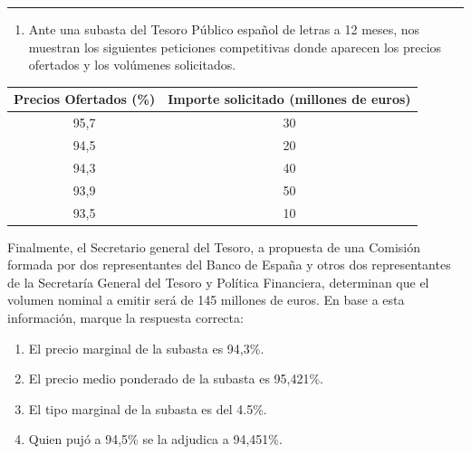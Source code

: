 \documentclass[
  letterpaper,
  DIV=11,
  numbers=noendperiod]{scrreprt}
\providecommand{\tightlist}{%
  \setlength{\itemsep}{0pt}\setlength{\parskip}{0pt}}\usepackage{longtable,booktabs,array}
\begin{document}
\begin{center}\rule{0.5\linewidth}{0.5pt}\end{center}

\begin{enumerate}
\def\labelenumi{\arabic{enumi}.}
\setcounter{enumi}{5}
\tightlist
\item
  Ante una subasta del Tesoro Público español de letras a 12 meses, nos
  muestran los siguientes peticiones competitivas donde aparecen los
  precios ofertados y los volúmenes solicitados.
\end{enumerate}

\begin{longtable}[]{@{}cc@{}}
\toprule()
Precios Ofertados (\%) & Importe solicitado (millones de euros) \\
\midrule()
\endhead
95,7 & 30 \\
94,5 & 20 \\
94,3 & 40 \\
93,9 & 50 \\
93,5 & 10 \\
\bottomrule()
\end{longtable}

Finalmente, el Secretario general del Tesoro, a propuesta de una
Comisión formada por dos representantes del Banco de España y otros dos
representantes de la Secretaría General del Tesoro y Política
Financiera, determinan que el volumen nominal a emitir será de 145
millones de euros. En base a esta información, marque la respuesta
correcta:

\begin{enumerate}
\def\labelenumi{\alph{enumi}.}
\item
  El precio marginal de la subasta es 94,3\%.
\item
  El precio medio ponderado de la subasta es 95,421\%.
\item
  El tipo marginal de la subasta es del 4.5\%.
\item
  Quien pujó a 94,5\% se la adjudica a 94,451\%.
\end{enumerate}
\end{document}
